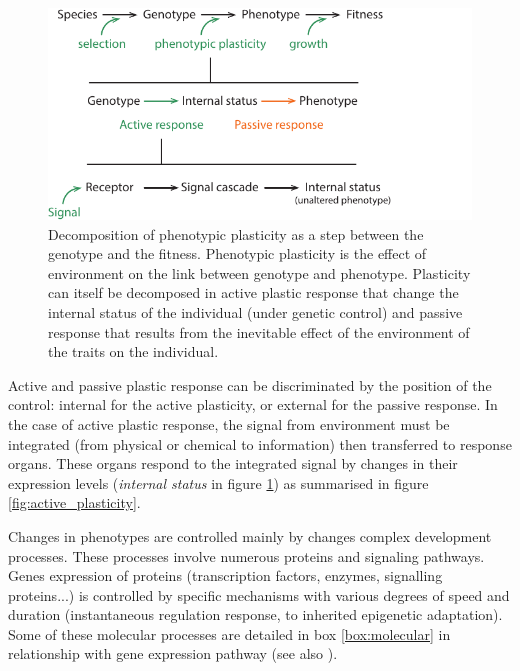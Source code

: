 {\begin{figure}
    \includegraphics[width=1\linewidth]{./2_PP/Figures/Concepts/genotype_to_phenotype.pdf}
  \caption[Decomposition of plastic response]{Decomposition of phenotypic plasticity as a step between the genotype and the fitness. Phenotypic plasticity is the effect of environment on the link between genotype and phenotype. Plasticity can itself be decomposed in active plastic response that change the internal status of the individual (under genetic control) and passive response that results from the inevitable effect of the environment of the traits on the individual.}
  \label{fig:plasticity_form}
\end{figure}

Active and passive plastic response can be discriminated by the position of the control: internal for the active plasticity, or external for the passive response. In the case of active plastic response, the signal from environment must be integrated (from physical or chemical to information) then transferred to response organs. These organs respond to the integrated signal by changes in their expression levels (\textit{internal status} in figure \ref{fig:plasticity_form}) as summarised in figure \ref{fig:active_plasticity}.

Changes in phenotypes are controlled mainly by changes complex development processes. These processes involve numerous proteins and signaling pathways. Genes expression of proteins (transcription factors, enzymes, signalling proteins...) is controlled by specific mechanisms with various degrees of speed and duration (instantaneous regulation response, to inherited epigenetic adaptation). Some of these molecular processes are detailed in box \ref{box:molecular} in relationship with gene expression pathway (see also \cite{nicotra_plant_2010}).


}
